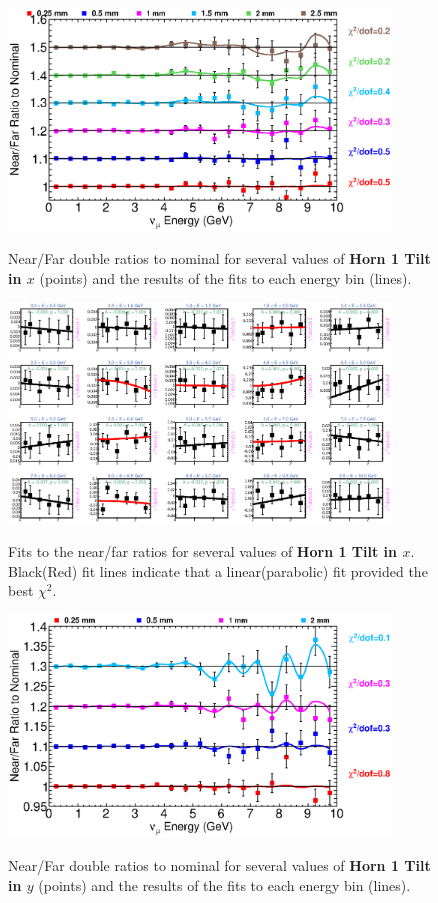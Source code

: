 \begin{figure}[ht]
  \begin{center}
    {\includegraphics[width=4.0in]{figures/Horn1XTilt_nof_summary.eps}}
  \end{center}
\caption{ Near/Far double ratios to nominal for several values of {\bf Horn 1 Tilt in $x$} (points) and the results of the fits to each energy bin (lines).}
\end{figure}

\begin{figure}[hb]
  \begin{center}
    {\includegraphics[width=4.0in]{figures/Horn1XTilt_nof_fits.eps}}
  \end{center}
\caption{ Fits to the near/far ratios for several values of {\bf Horn 1 Tilt in $x$}. Black(Red) fit lines indicate that a linear(parabolic) fit provided the best $\chi^2$. }
\end{figure}

\begin{figure}[ht]
  \begin{center}
    {\includegraphics[width=4.0in]{figures/Horn1YTilt_nof_summary.eps}}
  \end{center}
\caption{ Near/Far double ratios to nominal for several values of {\bf Horn 1 Tilt in $y$} (points) and the results of the fits to each energy bin (lines).}
\end{figure}


